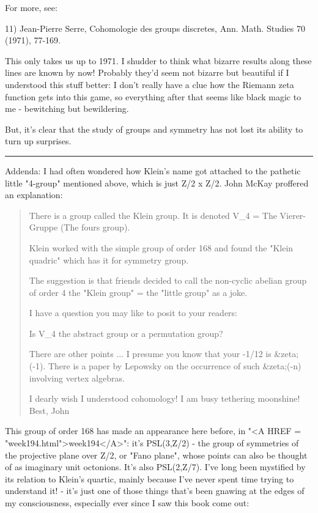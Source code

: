 For more, see:

11) Jean-Pierre Serre, Cohomologie des groups discretes, Ann. Math.
Studies 70 (1971), 77-169.

This only takes us up to 1971.  I shudder to think what bizarre 
results along these lines are known by now!  Probably they'd seem not
bizarre but beautiful if I understood this stuff better: I don't really
have a clue how the Riemann zeta function gets into this game, so 
everything after that seems like black magic to me - bewitching but
bewildering.

But, it's clear that the study of groups and symmetry has not lost its
ability to turn up surprises.

\par\noindent\rule{\textwidth}{0.4pt}
Addenda: I had often wondered how Klein's name got attached to the
pathetic little "4-group" mentioned above, which is just Z/2 x Z/2.
John McKay proffered an explanation:

\begin{quote}
 There is a group called the Klein group.
 It is denoted V_{4} = The Vierer-Gruppe  (The fours group).

 Klein worked with the simple group of order 168 and found
 the "Klein quadric" which has it for symmetry group.

 The suggestion is that friends decided to call the non-cyclic 
 abelian group of order 4 the "Klein group" = the "little group"
 as a joke.

 I have a question you may like to posit to your readers:

 Is V_{4} the abstract group or a permutation group?
 
 There are other points ... I presume you know that your
 -1/12 is &zeta;(-1). There is a paper by Lepowsky on the occurrence
 of such &zeta;(-n) involving vertex algebras.

 I dearly wish I understood cohomology!
 I am busy tethering moonshine!
 Best,
 John
\end{quote}

This group of order 168 has made an appearance here before, in "<A HREF
= "week194.html">week194</A>": it's PSL(3,Z/2) - the group of
symmetries of the projective plane over Z/2, or "Fano plane", whose
points can also be thought of as imaginary unit octonions.  It's also
PSL(2,Z/7).  I've long been mystified by its relation to Klein's
quartic, mainly because I've never spent time trying to understand it!
- it's just one of those things that's been gnawing at the edges of my
consciousness, especially ever since I saw this book come out:

